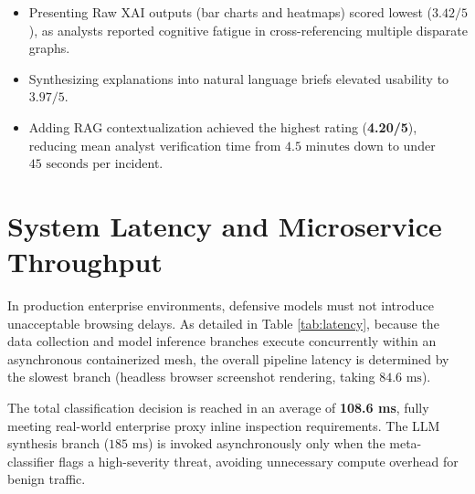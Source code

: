 \begin{itemize}
\item Presenting Raw XAI outputs (bar charts and heatmaps) scored lowest ($3.42/5$), as analysts reported cognitive fatigue in cross-referencing multiple disparate graphs.
\item Synthesizing explanations into natural language briefs elevated usability to $3.97/5$.
\item Adding RAG contextualization achieved the highest rating (\textbf{4.20/5}), reducing mean analyst verification time from $4.5\text{ minutes}$ down to under $45\text{ seconds}$ per incident.
\end{itemize}

\section{System Latency and Microservice Throughput}
In production enterprise environments, defensive models must not introduce unacceptable browsing delays. As detailed in Table \ref{tab:latency}, because the data collection and model inference branches execute concurrently within an asynchronous containerized mesh, the overall pipeline latency is determined by the slowest branch (headless browser screenshot rendering, taking $84.6\text{ ms}$).

\begin{table}[htbp]
\centering
{}
\vspace{0.2cm}
\caption{Component-Wise Execution Latency and Computational Overhead}
\label{tab:latency}
\end{table}

The total classification decision is reached in an average of \textbf{108.6 ms}, fully meeting real-world enterprise proxy inline inspection requirements. The LLM synthesis branch ($185\text{ ms}$) is invoked asynchronously only when the meta-classifier flags a high-severity threat, avoiding unnecessary compute overhead for benign traffic.
